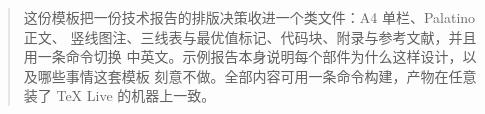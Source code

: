 \documentclass[logo, zh]{boogonreport}
\begin{document}
\maketitle

\begin{abstract}
这份模板把一份技术报告的排版决策收进一个类文件：A4 单栏、Palatino 正文、
竖线图注、三线表与最优值标记、代码块、附录与参考文献，并且用一条命令切换
中英文。示例报告本身说明每个部件为什么这样设计，以及哪些事情这套模板
刻意不做。全部内容可用一条命令构建，产物在任意装了 TeX Live 的机器上一致。
\end{abstract}



\newpage
\tableofcontents
\newpage










\appendix

\end{document}
